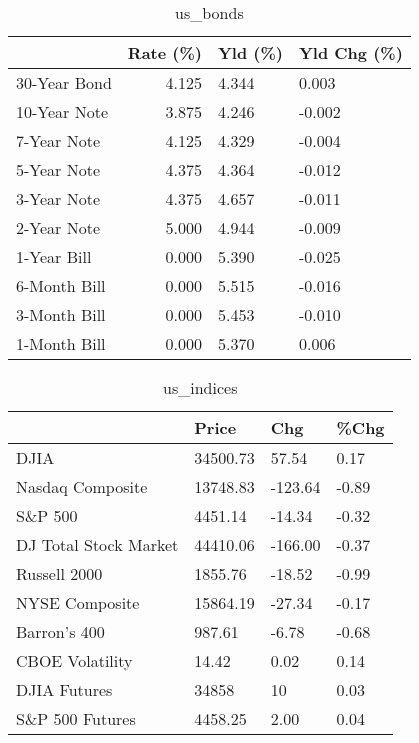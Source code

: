 \documentclass{article}%
\begin{document}
\begin{table}[htbp]%
\caption{us\_bonds}%
\centering%
\begin{adjustbox}{width=1\textwidth}%
\begin{tabular}{lrll}
\toprule
             &  Rate (\%) & Yld (\%) & Yld Chg (\%) \\
\midrule
30-Year Bond &     4.125 &   4.344 &       0.003 \\
10-Year Note &     3.875 &   4.246 &      -0.002 \\
 7-Year Note &     4.125 &   4.329 &      -0.004 \\
 5-Year Note &     4.375 &   4.364 &      -0.012 \\
 3-Year Note &     4.375 &   4.657 &      -0.011 \\
 2-Year Note &     5.000 &   4.944 &      -0.009 \\
 1-Year Bill &     0.000 &   5.390 &      -0.025 \\
6-Month Bill &     0.000 &   5.515 &      -0.016 \\
3-Month Bill &     0.000 &   5.453 &      -0.010 \\
1-Month Bill &     0.000 &   5.370 &       0.006 \\
\bottomrule
\end{tabular}
%
\end{adjustbox}%
\end{table}

%


\begin{table}[htbp]%
\caption{us\_indices}%
\centering%
\begin{adjustbox}{width=1\textwidth}%
\begin{tabular}{llll}
\toprule
                      &    Price &     Chg &  \%Chg \\
\midrule
                 DJIA & 34500.73 &   57.54 &  0.17 \\
     Nasdaq Composite & 13748.83 & -123.64 & -0.89 \\
              S\&P 500 &  4451.14 &  -14.34 & -0.32 \\
DJ Total Stock Market & 44410.06 & -166.00 & -0.37 \\
         Russell 2000 &  1855.76 &  -18.52 & -0.99 \\
       NYSE Composite & 15864.19 &  -27.34 & -0.17 \\
         Barron's 400 &   987.61 &   -6.78 & -0.68 \\
      CBOE Volatility &    14.42 &    0.02 &  0.14 \\
         DJIA Futures &    34858 &      10 &  0.03 \\
      S\&P 500 Futures &  4458.25 &    2.00 &  0.04 \\
\bottomrule
\end{tabular}
%
\end{adjustbox}%
\end{table}
\end{document}
